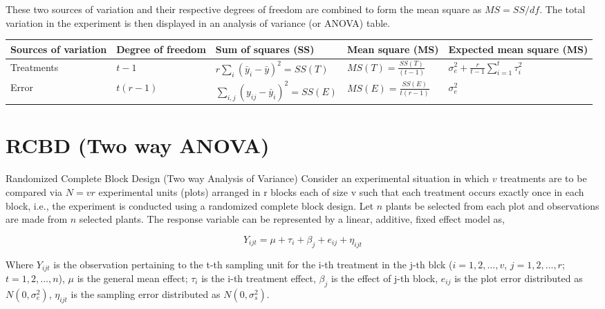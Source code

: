 \documentclass[
  ignorenonframetext,
  aspectratio=169]{beamer}
\begin{document}
\begin{frame}{}
\protect\hypertarget{section-5}{}
These two sources of variation and their respective degrees of freedom
are combined to form the mean square as \(MS = SS/df\). The total
variation in the experiment is then displayed in an analysis of variance
(or ANOVA) table.

\begin{table}
\centering\begingroup\fontsize{8}{10}\selectfont

\begin{tabular}{>{\raggedright\arraybackslash}p{6em}>{\raggedright\arraybackslash}p{5em}>{\raggedright\arraybackslash}p{8em}>{\raggedright\arraybackslash}p{6em}>{\raggedright\arraybackslash}p{8em}}
\toprule
Sources of variation & Degree of freedom & Sum of squares (SS) & Mean square (MS) & Expected mean square (MS)\\
\midrule
Treatments & $t-1$ & $r \sum_i (\bar{y}_i - \bar{y})^2 = SS(T)$ & $MS(T) = \frac{SS(T)}{(t-1)}$ & $\sigma_e^2 + \frac{r}{t-1} \sum_{i = 1}^t \tau_i^2$\\
Error & $t(r-1)$ & $\sum_{i,j} (y_{ij} - \bar{y}_i)^2 = SS(E)$ & $MS(E) = \frac{SS(E)}{t(r-1)}$ & $\sigma_e^2$\\
\bottomrule
\end{tabular}
\endgroup{}
\end{table}
\end{frame}

\hypertarget{rcbd-two-way-anova}{%
\section{RCBD (Two way ANOVA)}\label{rcbd-two-way-anova}}

\begin{frame}{Randomized Complete Block Design (Two way Analysis of
Variance)}
\protect\hypertarget{randomized-complete-block-design-two-way-analysis-of-variance}{}
Consider an experimental situation in which \(v\) treatments are to be
compared via \(N = vr\) experimental units (plots) arranged in r blocks
each of size v such that each treatment occurs exactly once in each
block, i.e., the experiment is conducted using a randomized complete
block design. Let \(n\) plants be selected from each plot and
observations are made from \(n\) selected plants. The response variable
can be represented by a linear, additive, fixed effect model as,

\[
Y_{ijt} = \mu + \tau_i + \beta_j + e_{ij} + \eta_{ijt}
\]

Where \(Y_{ijt}\) is the observation pertaining to the t-th sampling
unit for the i-th treatment in the j-th blck (\(i = 1, 2, \ldots, v\),
\(j = 1, 2, \ldots, r\); \(t = 1, 2, \ldots, n\)), \(\mu\) is the
general mean effect; \(\tau_i\) is the i-th treatment effect,
\(\beta_j\) is the effect of j-th block, \(e_{ij}\) is the plot error
distributed as \(N(0, \sigma_e^2)\), \(\eta_{ijt}\) is the sampling
error distributed as \(N(0, \sigma_s^2)\).
\end{frame}
\end{document}
